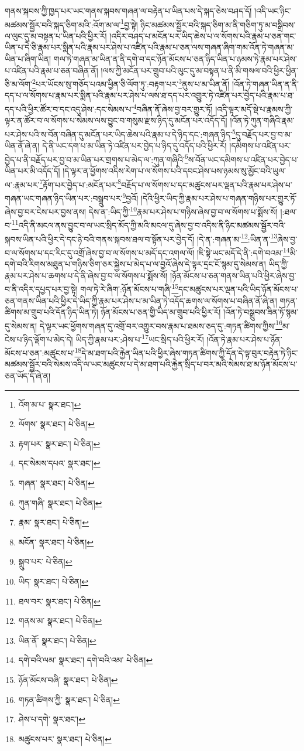 གནས་སྐབས་ཀྱི་ཁྱད་པར་ཡང་གནས་སྐབས་གཞན་ལ་བརྟེན་པ་ཡིན་པས་དེ་སྐད་ཅེས་བཤད་དོ། །འདི་ཡང་ཉིང་མཚམས་སྦྱོར་བའི་སྐད་ཅིག་མའི་:འོག་མ་ལ་\footnote{འོག་མ་པ་  སྣར་ཐང་། }བྱ་སྟེ། ཉིང་མཚམས་སྦྱོར་བའི་སྐད་ཅིག་མ་ནི་གཅིག་ཏུ་མ་བསྒྲིབས་ལ་ལུང་དུ་མ་བསྟན་པ་ཡིན་པའི་ཕྱིར་རོ། །འདིར་བཤད་པ་མངོན་པར་ཡིད་ཆེས་པ་ལ་སོགས་པའི་རྣམ་པ་ཅན་གང་ཡིན་པ་དེ་ཅི་རྣམ་པར་སྨིན་པའི་རྣམ་པར་ཤེས་པ་འཛིན་པའི་རྣམ་པ་ཅན་ལས་གཞན་ཞིག་གམ་འོན་ཏེ་གཞན་མ་ཡིན་པ་ཞིག་ཡིན། གལ་ཏེ་གཞན་མ་ཡིན་ན་ནི་དགེ་བ་དང་ཉོན་མོངས་པ་ཅན་ཉིད་ཡིན་པ་ཉམས་ཏེ་རྣམ་པར་ཤེས་པ་འཛིན་པའི་རྣམ་པ་ཅན་བཞིན་ནོ། །ལས་ཀྱི་མངོན་པར་གྲུབ་པའི་ལུང་དུ་མ་བསྟན་པ་ནི་མི་གསལ་བའི་ཕྱིར་ཕྱིན་ཅི་མ་ལོག་\footnote{ལོགས་  སྣར་ཐང་།  པེ་ཅིན། }པར་ཡོངས་སུ་གཅོད་པའམ་ཕྱིན་ཅི་ལོག་ཏུ་:བརྟག་པར་\footnote{རྟག་པར་  སྣར་ཐང་།  པེ་ཅིན། }ནུས་པ་མ་ཡིན་ནོ། །འོན་ཏེ་གཞན་ཡིན་ན་ནི་དད་པ་ལ་སོགས་པ་རྣམ་པར་སྨིན་པའི་རྣམ་པར་ཤེས་པ་ལས་ཐ་དད་པར་འགྱུར་ཏེ་འཛིན་པར་བྱེད་པའི་རྣམ་པ་ཐ་དད་པའི་ཕྱིར་ཚོར་བ་དང་འདུ་ཤེས་:དང་སེམས་པ་\footnote{དང་སེམས་དཔའ་  སྣར་ཐང་། }བཞིན་ནོ་ཞེས་བྱ་བར་གྱུར་ཏོ། །འདི་ལྟར་མདོ་སྡེ་པ་རྣམས་ཀྱི་ལྟར་ན་ཚོར་བ་ལ་སོགས་པ་སེམས་ལས་བྱུང་བ་གསུམ་རྫས་ཉིད་དུ་མངོན་པར་འདོད་དོ། །འོན་ཏེ་ཀུན་གཞིའི་རྣམ་པར་ཤེས་པའི་ས་བོན་བཞིན་དུ་མངོན་པར་ཡིད་ཆེས་པའི་རྣམ་པ་དེ་ཉིད་དང་:གཞན་ཉིད་\footnote{གཞན་  སྣར་ཐང་།  པེ་ཅིན། }དུ་བརྗོད་པར་བྱ་བ་མ་ཡིན་ནོ་ཞེ་ན། དེ་ནི་ཡང་དག་པ་མ་ཡིན་ཏེ་འཛིན་པར་བྱེད་པ་ཉིད་དུ་འདོད་པའི་ཕྱིར་རོ། །དམིགས་པ་འཛིན་པར་བྱེད་པ་ནི་བརྗོད་པར་བྱ་བ་མ་ཡིན་པར་གྲགས་པ་མེད་ལ་:ཀུན་གཞིའི་\footnote{ཀུན་གཞི་  སྣར་ཐང་།  པེ་ཅིན། }ས་བོན་ཡང་དམིགས་པ་འཛིན་པར་བྱེད་པ་ཡིན་པར་མི་འདོད་དོ། །དེ་ལྟར་ན་ཕྱོགས་འདིས་རེག་པ་ལ་སོགས་པའི་དབང་ཤེས་པས་ཉམས་སུ་མྱོང་བའི་ཡུལ་ལ་:རྣམ་པར་\footnote{རྣམ་  སྣར་ཐང་།  པེ་ཅིན། }རྟོག་པར་བྱེད་པ་:མངོན་པར་\footnote{མངོན་  སྣར་ཐང་།  པེ་ཅིན། }བརྗོད་པ་ལ་སོགས་པ་དང་མཚུངས་པར་ལྡན་པའི་རྣམ་པར་ཤེས་པ་གཞན་ཡང་གཞན་ཉིད་ཡིན་པར་:བསྒྲུབ་པར་\footnote{སྒྲུབ་པར་  པེ་ཅིན། }བྱའོ། །དེའི་ཕྱིར་ཡིད་ཀྱི་རྣམ་པར་ཤེས་པ་གཞན་གཉིས་པར་གྱུར་ཏོ་ཞེས་བྱ་བར་ངེས་པར་བྱས་ནས། དེས་ན་:ཡིད་ཀྱི་\footnote{ཡིད་  སྣར་ཐང་།  པེ་ཅིན། }རྣམ་པར་ཤེས་པ་གཉིས་ཞེས་བྱ་བ་ལ་སོགས་པ་སྨོས་སོ། །:ཐལ་བ་\footnote{ཐལ་བར་  སྣར་ཐང་།  པེ་ཅིན། }འདི་ནི་མངལ་ནས་བྱུང་བ་ལ་ཡང་སྲིད་མོད་ཀྱི་མའི་མངལ་དུ་ཞེས་བྱ་བ་འདིས་ནི་ཉིང་མཚམས་སྦྱོར་བའི་སྐབས་ཡིན་པའི་ཕྱིར་དེ་དང་ཉེ་བའི་གནས་སྐབས་ཐལ་བ་སྟོན་པར་བྱེད་དོ། །དེ་ན་:གཞན་མ་\footnote{གནས་མ་  སྣར་ཐང་།  པེ་ཅིན། }:ཡིན་ན་\footnote{ཡིན་ནོ་  སྣར་ཐང་།  པེ་ཅིན། }ཞེས་བྱ་བ་ལ་སོགས་པ་དང་རིང་དུ་འགྲོ་ཞེས་བྱ་བ་ལ་སོགས་པ་མདོ་དང་འགལ་ལོ། །ཇི་སྟེ་ཡང་མདོ་དེ་ནི་:དགེ་བའམ་\footnote{དགེ་བའི་ལམ་  སྣར་ཐང་། དགེ་བའི་འམ་  པེ་ཅིན། }མི་དགེ་བའི་རིགས་མཐུན་པ་གཉིས་ཅིག་ཅར་སྐྱེས་པ་མེད་པ་ལ་བྱའོ་ཞེས་དེ་ལྟར་དྲང་ངོ་སྙམ་དུ་སེམས་ན། ཡིད་ཀྱི་རྣམ་པར་ཤེས་པ་ཆགས་པ་དེ་ནི་ཞེས་བྱ་བ་ལ་སོགས་པ་སྨོས་སོ། །ཉོན་མོངས་པ་ཅན་གནས་ཡིན་པའི་ཕྱིར་ཞེས་བྱ་བ་ནི་འདིར་དཔྱད་པར་བྱ་སྟེ། གལ་ཏེ་རེ་ཞིག་:ཉོན་མོངས་པ་གཞི་\footnote{ཉོན་མོངས་བཞི་  སྣར་ཐང་།  པེ་ཅིན། }དང་མཚུངས་པར་ལྡན་པའི་ཡིད་ཉོན་མོངས་པ་ཅན་གནས་ཡིན་པའི་ཕྱིར་དེ་ཡིད་ཀྱི་རྣམ་པར་ཤེས་པ་མ་ཡིན་ཏེ་འདོད་ཆགས་ལ་སོགས་པ་བཞིན་ནོ་ཞེ་ན། གཏན་ཚིགས་མ་གྲུབ་པའི་དོན་ཉིད་ཡིན་ཏེ། ཉོན་མོངས་པ་ཅན་གྱི་ཡིད་མ་གྲུབ་པའི་ཕྱིར་རོ། །འོན་ཏེ་བསྒྲུབས་ཟིན་ཏོ་སྙམ་དུ་སེམས་ན། དེ་ལྟར་ཡང་ཕྱོགས་གཞན་དུ་འགྲོ་བར་འགྱུར་བས་རྣམ་པ་ཐམས་ཅད་དུ་:གཏན་ཚིགས་ཀྱིས་\footnote{གཏན་ཚིགས་ཀྱི་  སྣར་ཐང་།  པེ་ཅིན། }མ་ངེས་པ་ཉིད་ལྡོག་པ་མེད་དེ། ཡིད་ཀྱི་རྣམ་པར་:ཤེས་པ་\footnote{ཤེས་པ་དགེ་  སྣར་ཐང་། }ཡང་སྲིད་པའི་ཕྱིར་རོ། །འོན་ཏེ་རྣམ་པར་ཤེས་པ་ཉོན་མོངས་པ་ཅན་:མཚུངས་པ་\footnote{མཚུངས་པར་  སྣར་ཐང་།  པེ་ཅིན། }དེ་མ་ཐག་པའི་རྐྱེན་ཡིན་པའི་ཕྱིར་ཞེས་གཏན་ཚིགས་ཀྱི་དོན་དེ་ལྟ་བུར་བརྟེན་ཏེ་ཉིང་མཚམས་སྦྱོར་བའི་སེམས་འདི་ལ་ཡང་མཚུངས་པ་དེ་མ་ཐག་པའི་རྐྱེན་སྲིད་པ་བར་མའི་སེམས་ཐ་མ་ཉོན་མོངས་པ་ཅན་ཡོད་དོ་ཞེ་ན། 